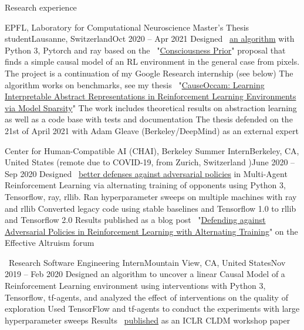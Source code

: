 \documentclass{resume} %
\newcommand*{\img}[1]{%
	\raisebox{-.02\baselineskip}{%
		\texttt{[image: \#1]}%
	}%
}
\newcommand*{\emoji}[1]{\img{./emoji/\imgpref#1.png}}
\newcommand*{\mybold}[1]{{\color{pinkunderline} #1}}
\newcommand*{\logo}[1]{%
	\raisebox{-.02\baselineskip}{%
		\texttt{[image: ./img/\\imgpref\#1]}%
	}%
}
\def\imgpref{bleak-}
\newcommand{\mylink}{{\color{gray}\faExternalLink}}
\begin{document}
\begin{rSection}{Research experience}			  
	\begin{rSubsection}{EPFL, Laboratory for Computational Neuroscience \emoji{flag-ch}}{Master's Thesis student}{Lausanne, Switzerland}{Oct 2020 -- Apr 2021}
		\myitem Designed \mylink~\href{https://github.com/sergia-ch/causality-disentanglement-rl}{an algorithm} with \mybold{Python 3, Pytorch and ray} based on the \mylink~"\href{https://arxiv.org/abs/1709.08568}{Consciousness Prior}" proposal that finds a simple causal model of an RL environment in the general case from pixels. The project is a continuation of my Google Research internship (see below)
		\myitem The algorithm works on benchmarks, see my thesis \mylink~"\href{https://sergia-ch.github.io/causality-simplicity/CauseOccam_Learning_Interpretable_Abstract_Representations_in_Reinforcement_Learning_Environments_via_Model_Sparsity.pdf}{CauseOccam: Learning Interpretable Abstract Representations in
			Reinforcement Learning Environments via Model Sparsity}"
		\myitem The work includes \mybold{theoretical results on abstraction learning as well as a code base with tests and documentation}
		\myitem The thesis defended on the 21st of April 2021 with Adam Gleave (Berkeley/DeepMind) as an external expert
	\end{rSubsection}
	
	\begin{rSubsection}{\logo{chai-logo.png} \logo{UCBerkeley.png} Center for Human-Compatible AI (CHAI), Berkeley \emoji{flag-us}}{Summer Intern}{Berkeley, CA, United States (remote due to COVID-19, from Zurich, Switzerland \emoji{flag-ch})}{June 2020 -- Sep 2020}
		\myitem Designed \mylink~\href{https://github.com/HumanCompatibleAI/better-adversarial-defenses/} {better \mybold{defenses against adversarial policies}} in Multi-Agent Reinforcement Learning via alternating training of opponents using \mybold{Python 3, Tensorflow, ray, rllib}.
		\myitem Ran hyperparameter sweeps on multiple machines with ray and rllib
		\myitem Converted legacy code using stable baselines and Tensorflow 1.0 to rllib and Tensorflow 2.0
		\myitem Results published as a blog post \mylink~"\href{https://forum.effectivealtruism.org/posts/YscrJFofd6S8eJGS8/defending-against-adversarial-policies-in-reinforcement}{Defending against Adversarial Policies in Reinforcement Learning with Alternating Training}" on the Effective Altruism forum
	\end{rSubsection}


	\begin{rSubsection}{{\large\vspace*{-0.7mm}\google}\ Research \emoji{flag-us}}{Software Engineering Intern}{Mountain View, CA, United States}{Nov 2019 -- Feb 2020}
		\myitem Designed an algorithm to uncover a linear \mybold{Causal Model} of a \mybold{Reinforcement Learning} environment using interventions with \mybold{Python 3, Tensorflow, tf-agents}, and analyzed the effect of interventions on the quality of exploration
		\myitem Used TensorFlow and tf-agents to conduct the experiments with large hyperparameter sweeps
		\myitem Results \mylink~\href{https://arxiv.org/abs/2002.05217}{published} as an ICLR CLDM workshop paper
	\end{rSubsection}



\end{rSection}
\end{document}
